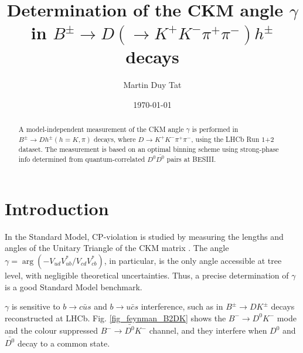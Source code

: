 \documentclass[12pt, a4paper, notitlepage, onecolumn]{article}
\title{Determination of the CKM angle $\gamma$ in $B^\pm\to D(\to K^+K^-\pi^+\pi^-)h^\pm$ decays}
\author{Martin Duy Tat}
\date{\today}
\begin{document}
\maketitle
\begin{abstract}
\noindent A model-independent measurement of the CKM angle $\gamma$ is performed in $B^\pm\to Dh^\pm (h = K, \pi)$ decays, where $D\to K^+K^-\pi^+\pi^-$, using the LHCb Run $1$+$2$ dataset. The measurement is based on an optimal binning scheme using strong-phase info determined from quantum-correlated $D^0\bar{D^0}$ pairs at BESIII.
\end{abstract}
\section{Introduction}
\noindent In the Standard Model, CP-violation is studied by measuring the lengths and angles of the Unitary Triangle of the CKM matrix \cite{cite_CKM}. The angle $\gamma = \arg(-V_{ud}V^*_{ub}/V_{cd}V^*_{cb})$, in particular, is the only angle accessible at tree level, with negligible theoretical uncertainties. Thus, a precise determination of $\gamma$ is a good Standard Model benchmark.

$\gamma$ is sensitive to $b\to c\bar{u}s$ and $b\to u\bar{c}s$ interference, such as in $B^\pm\to DK^\pm$ decays reconstructed at LHCb. Fig. \ref{fig_feynman_B2DK} shows the $B^-\to D^0K^-$ mode and the colour suppressed $B^-\to\bar{D^0}K^-$ channel, and they interfere when $D^0$ and $\bar{D^0}$ decay to a common state.
\end{document}
